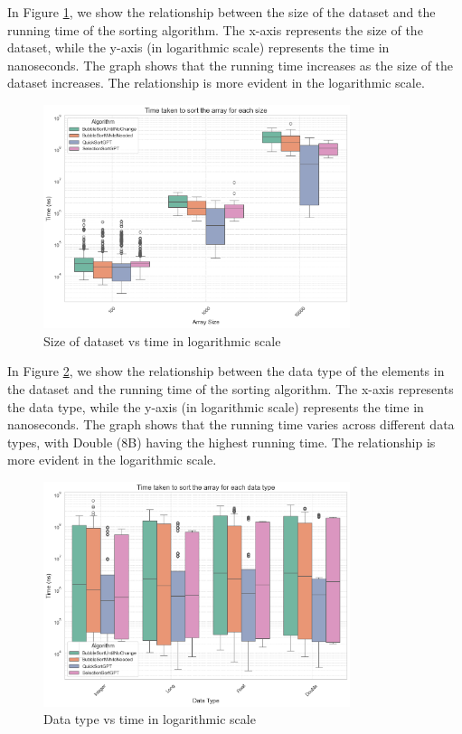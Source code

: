 \documentclass[unicode,11pt,a4paper,oneside,numbers=endperiod,openany]{scrartcl}
\begin{document}
    In Figure \ref{fig:hip2}, we show the relationship between the size of the dataset and the running time of the sorting algorithm. The x-axis represents the size of the dataset, while the y-axis (in logarithmic scale) represents the time in nanoseconds. The graph shows that the running time increases as the size of the dataset increases. The relationship is more evident in the logarithmic scale.\\
\hfill



\begin{figure}[htbp]
    \centering
    \includegraphics[width=0.8\textwidth]{./fig/hip2.png}
    \caption{Size of dataset vs time in logarithmic scale}
    \label{fig:hip2}
\end{figure}


    In Figure \ref{fig:hip3}, we show the relationship between the data type of the elements in the dataset and the running time of the sorting algorithm. The x-axis represents the data type, while the y-axis (in logarithmic scale) represents the time in nanoseconds. The graph shows that the running time varies across different data types, with Double (8B) having the highest running time. The relationship is more evident in the logarithmic scale.\\
\hfill
        \begin{figure}[htbp]
            \centering
            \includegraphics[width=0.8\textwidth]{./fig/hip3.png}
            \caption{Data type vs time in logarithmic scale}
            \label{fig:hip3}
        \end{figure}
\end{document}
